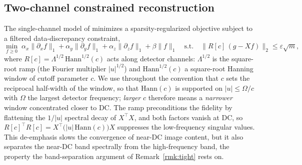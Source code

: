 \documentclass{article}
\begin{document}
\subsection{Two-channel constrained reconstruction}

The single-channel model of \citet{sidky2025accurate} minimizes a sparsity-regularized objective subject to a filtered data-discrepancy constraint,
\begin{equation}
\label{eq:single}
\min_{f\ge 0}\;
\alpha_x\|\partial_x f\|_1+\alpha_y\|\partial_y f\|_1+\alpha_z\|\partial_z f\|_1+\beta\|f\|_1
\quad\text{s.t.}\quad
\big\|R[c]\,(g-Xf)\big\|_2\le\varepsilon\sqrt{m},
\end{equation}
where $R[c]=\Lambda^{1/2}\,\mathrm{Hann}^{1/2}(c)$ acts along detector channels: $\Lambda^{1/2}$ is the square-root ramp (the Fourier multiplier $|u|^{1/2}$) and $\mathrm{Hann}^{1/2}(c)$ a square-root Hanning window of cutoff parameter $c$. We use throughout the convention that $c$ sets the reciprocal half-width of the window, so that $\mathrm{Hann}(c)$ is supported on $|u|\le\Omega/c$ with $\Omega$ the largest detector frequency; \emph{larger} $c$ therefore means a \emph{narrower} window concentrated closer to DC. The ramp preconditions the fidelity by flattening the $1/|u|$ spectral decay of $X^\top X$, and both factors vanish at DC, so $R[c]^\top R[c]=X^\top\big(|u|\,\mathrm{Hann}(c)\big)X$ suppresses the low-frequency singular values. This de-emphasis slows the convergence of near-DC image content, but it also separates the near-DC band spectrally from the high-frequency band, the property the band-separation argument of Remark~\ref{rmk:tight} rests on.
\end{document}
